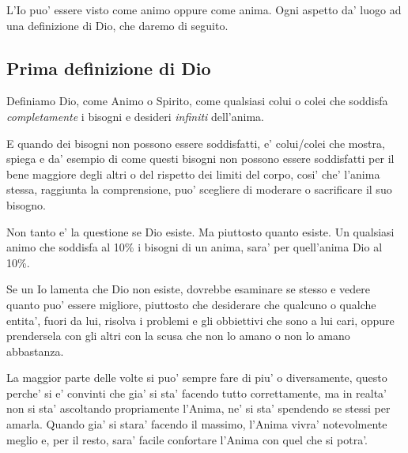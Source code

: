 L'Io puo' essere visto come animo oppure come anima. Ogni aspetto da' luogo ad una definizione di Dio, che daremo di seguito.

\subsection{Prima definizione di Dio}

   Definiamo Dio, come Animo o Spirito, come qualsiasi colui o colei che soddisfa \emph{completamente} i bisogni e desideri \emph{infiniti} dell'anima. 

   E quando dei bisogni non possono essere soddisfatti, e' colui/colei che mostra, spiega e da' esempio di come questi bisogni non possono essere soddisfatti per il bene maggiore degli altri o del rispetto dei limiti del corpo, cosi' che' l'anima stessa, raggiunta la comprensione, puo' scegliere di moderare o sacrificare il suo bisogno.

   Non tanto e' la questione se Dio esiste. Ma piuttosto quanto esiste. Un qualsiasi animo che soddisfa al 10\% i bisogni di un anima, sara' per quell'anima Dio al 10\%.

   Se un Io lamenta che Dio non esiste, dovrebbe esaminare se stesso e vedere quanto puo' essere migliore, piuttosto che desiderare che qualcuno o qualche entita', fuori da lui, risolva i problemi e gli obbiettivi che sono a lui cari, oppure prendersela con gli altri con la scusa che non lo amano o non lo amano abbastanza.

    La maggior parte delle volte si puo' sempre fare di piu' o diversamente, questo perche' si e' convinti che gia' si sta' facendo tutto correttamente, ma in realta' non si sta' ascoltando propriamente l'Anima, ne' si sta' spendendo se stessi per amarla. Quando gia' si stara' facendo il massimo, l'Anima vivra' notevolmente meglio e, per il resto, sara' facile confortare l'Anima con quel che si potra'.


